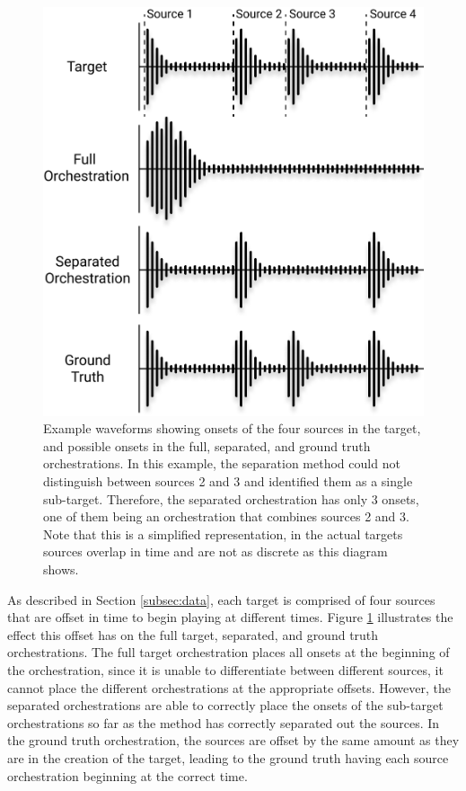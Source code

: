 \documentclass{article}
\begin{document}
		\begin{figure}[t]
		\centering
			\includegraphics[width=\columnwidth]{figures/orch.jpg}
			\caption{Example waveforms showing onsets of the four sources in the target, and possible onsets in the full, separated, and ground truth orchestrations. In this example, the separation method could not distinguish between sources 2 and 3 and identified them as a single sub-target. Therefore, the separated orchestration has only 3 onsets, one of them being an orchestration that combines sources 2 and 3. Note that this is a simplified representation, in the actual targets sources overlap in time and are not as discrete as this diagram shows.}\label{fig:orchestrations}
		\end{figure}		
		
		As described in Section \ref{subsec:data}, each target is comprised of four sources that are offset in time to begin playing at different times. Figure \ref{fig:orchestrations} illustrates the effect this offset has on the full target, separated, and ground truth orchestrations. The full target orchestration places all onsets at the beginning of the orchestration, since it is unable to differentiate between different sources, it cannot place the different orchestrations at the appropriate offsets. However, the separated orchestrations are able to correctly place the onsets of the sub-target orchestrations so far as the method has correctly separated out the sources. In the ground truth orchestration, the sources are offset by the same amount as they are in the creation of the target, leading to the ground truth having each source orchestration beginning at the correct time.
		
\end{document}

